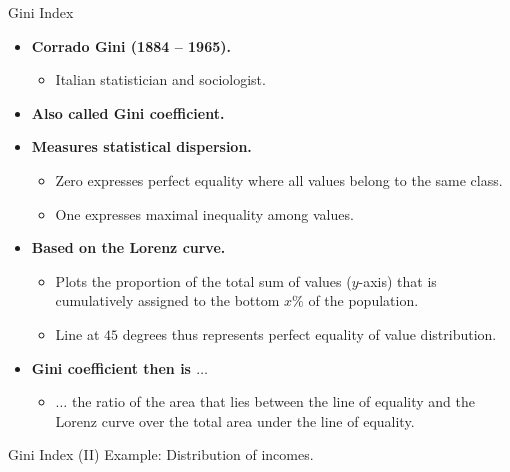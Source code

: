 \begin{frame}{Gini Index}
  \begin{itemize}
  \item \textbf{Corrado Gini (1884 -- 1965).}
    \begin{itemize}
    \item Italian statistician and sociologist.
    \end{itemize}
  \item \textbf{Also called Gini coefficient.}
  \item \textbf{Measures statistical dispersion.}
    \begin{itemize}
    \item Zero expresses perfect equality where all values belong to the same class.
    \item One expresses maximal inequality among values.
    \end{itemize}
  \item \textbf{Based on the Lorenz curve.}
    \begin{itemize}
    \item Plots the proportion of the total sum of values ($y$-axis) that is cumulatively assigned to the bottom $x\%$ of the population.
    \item Line at $45$ degrees thus represents perfect equality of value distribution.
    \end{itemize}
  \item \textbf{Gini coefficient then is $\ldots$}
    \begin{itemize}
    \item $\ldots$ the ratio of the area that lies between the line of equality and the Lorenz curve over the total area under the line of equality.
    \end{itemize}
  \end{itemize}
\end{frame}

\begin{frame}{Gini Index (II)} %
  \centering
  Example: Distribution of incomes.\\[0.5cm]
\end{frame}

